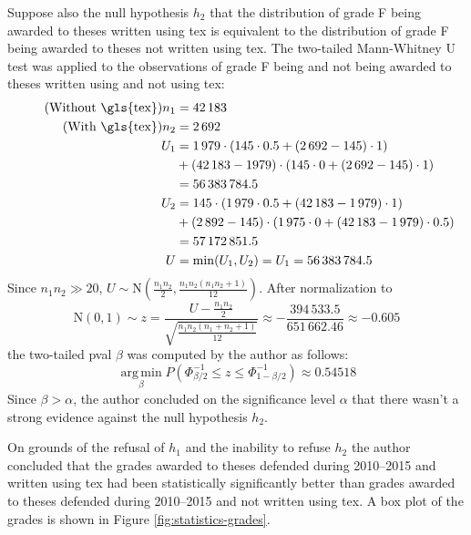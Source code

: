 \documentclass[12pt,twoside,cover,color,table]%
  {fithesis3/fithesis3/fithesis3} %
\begin{document}
  Suppose also the null \gls{hypothesis} $h_2$ that the
  distribution of grade F being awarded to theses written using
  \gls{tex} is equivalent to the distribution of grade F being
  awarded to theses not written using \gls{tex}. The two-tailed
  Mann-Whitney U test \cite{mann47} was applied to the observations
  of grade F being and not being awarded to theses written using
  and not using \gls{tex}: \begin{align}
    \tag{Without \gls{tex}} n_1 &= 42\,183 \\
    \tag{With \gls{tex}}     n_2 &= 2\,692  \\
    U_1 &= 1\,979\cdot\left(145\cdot0.5+(2\,692-145)\cdot1\right) \\
    \nonumber&+(42\,183-1979)\cdot\left(145\cdot0+(2\,692-145)
      \cdot1\right) \\
      \nonumber&=56\,383\,784.5 \\
    U_2 &= 145\cdot\left(1\,979\cdot0.5+(42\,183-1\,979)\cdot1\right) \\
    \nonumber&+(2\,892-145)\cdot\left(1\,975\cdot0+(42\,183-1\,979)
      \cdot0.5\right) \\
      \nonumber&=57\,172\,851.5 \\
    U &= \min(U_1,U_2) = U_1 = 56\,383\,784.5
  \end{align} Since $n_1n_2\gg20$, $U\sim\text{N}(\frac{n_1n_2}2,
  \frac{n_1n_2(n_1n_2+1)}{12})$. After normalization to
  \begin{equation}
    \text{N}(0,1)\sim z =
    \frac{U-\frac{n_1n_2}2}{\sqrt{\frac{n_1n_2(n_1+n_2+1)}{12}}}
    \approx-\frac{394\,533.5}{651\,662.46}\approx-0.605
  \end{equation} the two-tailed \gls{pval} $\beta$ was computed by
  the author as follows:\begin{equation}
    \operatorname{arg\,min}\limits_{\beta} P(\Phi^{-1}_{\beta/2}
    \leq z\leq\Phi^{-1}_{1-\beta/2}) \approx 0.54518
  \end{equation}Since $\beta>\alpha$, the author concluded on the
  significance level $\alpha$ that there wasn't a strong evidence
  against the null \gls{hypothesis} $h_2$.
  
  On grounds of the refusal of $h_1$ and the inability to refuse
  $h_2$ the author concluded that the grades awarded to
  theses defended during 2010--2015 and written using \gls{tex}
  had been statistically significantly better than grades awarded
  to theses defended during 2010--2015 and not written using
  \gls{tex}. A box plot of the grades is shown in Figure
  \ref{fig:statistics-grades}.
\end{document}
